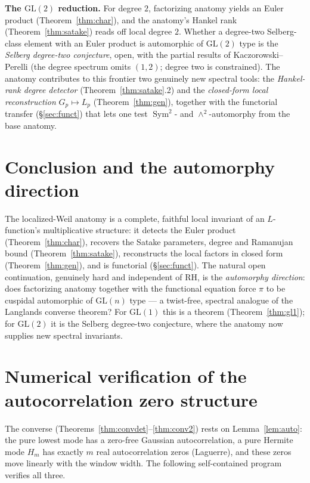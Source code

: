 \documentclass[11pt]{amsart}
\theoremstyle{definition}
\theoremstyle{remark}
\newcommand{\GL}{\mathrm{GL}}
\DeclareMathOperator{\Sym}{Sym}
\begin{document}
\noindent\textbf{The $\GL(2)$ reduction.} For degree $2$, factorizing anatomy
yields an Euler product (Theorem~\ref{thm:char}), and the anatomy's Hankel rank
(Theorem~\ref{thm:satake}) reads off local degree $2$. Whether a degree-two
Selberg-class element with an Euler product is automorphic of $\GL(2)$ type is the
\emph{Selberg degree-two conjecture}, open, with the partial results of
Kaczorowski--Perelli (the degree spectrum omits $(1,2)$; degree two is
constrained). The anatomy contributes to this frontier two genuinely new spectral
tools: the \emph{Hankel-rank degree detector} (Theorem~\ref{thm:satake}.2) and the
\emph{closed-form local reconstruction} $G_p\mapsto L_p$ (Theorem~\ref{thm:gen}),
together with the functorial transfer (\S\ref{sec:funct}) that lets one test
$\Sym^2$- and $\wedge^2$-automorphy from the base anatomy.

\section{Conclusion and the automorphy direction}
The localized-Weil anatomy is a complete, faithful local invariant of an
$L$-function's multiplicative structure: it detects the Euler product
(Theorem~\ref{thm:char}), recovers the Satake parameters, degree and Ramanujan
bound (Theorem~\ref{thm:satake}), reconstructs the local factors in closed form
(Theorem~\ref{thm:gen}), and is functorial (\S\ref{sec:funct}). The natural open
continuation, genuinely hard and independent of RH, is the \emph{automorphy
direction}: does factorizing anatomy together with the functional equation force
$\pi$ to be cuspidal automorphic of $\GL(n)$ type --- a twist-free, spectral
analogue of the Langlands converse theorem? For $\GL(1)$ this is a theorem
(Theorem~\ref{thm:gl1}); for $\GL(2)$ it is the Selberg degree-two conjecture,
where the anatomy now supplies new spectral invariants.

\appendix
\section{Numerical verification of the autocorrelation zero structure}\label{app:code}
The converse (Theorems~\ref{thm:convdet}--\ref{thm:conv2}) rests on
Lemma~\ref{lem:auto}: the pure lowest mode has a zero-free Gaussian
autocorrelation, a pure Hermite mode $H_m$ has exactly $m$ real autocorrelation
zeros (Laguerre), and these zeros move linearly with the window width. The
following self-contained program verifies all three.
\end{document}
